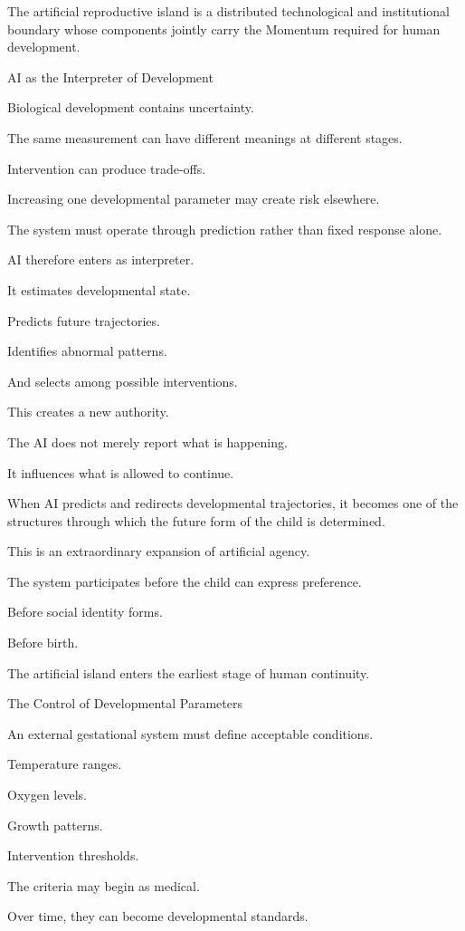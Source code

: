 The artificial reproductive island is a distributed technological and institutional boundary whose components jointly carry the Momentum required for human development.

AI as the Interpreter of Development

Biological development contains uncertainty.

The same measurement can have different meanings at different stages.

Intervention can produce trade-offs.

Increasing one developmental parameter may create risk elsewhere.

The system must operate through prediction rather than fixed response alone.

AI therefore enters as interpreter.

It estimates developmental state.

Predicts future trajectories.

Identifies abnormal patterns.

And selects among possible interventions.

This creates a new authority.

The AI does not merely report what is happening.

It influences what is allowed to continue.

When AI predicts and redirects developmental trajectories, it becomes one of the structures through which the future form of the child is determined.

This is an extraordinary expansion of artificial agency.

The system participates before the child can express preference.

Before social identity forms.

Before birth.

The artificial island enters the earliest stage of human continuity.

The Control of Developmental Parameters

An external gestational system must define acceptable conditions.

Temperature ranges.

Oxygen levels.

Growth patterns.

Intervention thresholds.

The criteria may begin as medical.

Over time, they can become developmental standards.

